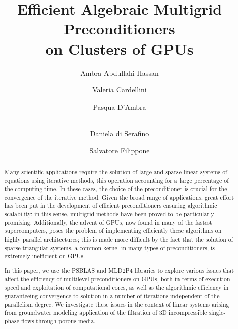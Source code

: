 \documentclass{llncs}
\begin{document}
\title{Efficient Algebraic Multigrid Preconditioners \\on Clusters of GPUs}
%
%
\author{Ambra Abdullahi Hassan%
\and Valeria Cardellini \and Pasqua D'Ambra \and \\ 
Daniela di Serafino \and  Salvatore Filippone}
%
%
\maketitle              %

\begin{abstract}
Many scientific applications require the solution of large and sparse linear systems of equations using iterative methods, this operation accounting for a large percentage of the computing time. In these cases, the choice of the preconditioner is crucial for the convergence of the iterative method.
Given the broad range of applications, great effort has been put in the development of efficient  preconditioners ensuring algorithmic scalability: in this sense, multigrid methods have been proved to be particularly promising.
Additionally, the advent of GPUs, now found in many of the fastest supercomputers, poses the problem of implementing efficiently these algorithms on highly parallel architectures; this is made more difficult by the fact that the solution of sparse triangular systems, a common kernel in many types of preconditioners, is extremely inefficient on GPUs. 

In this paper, we use the PSBLAS and MLD2P4 libraries to explore various issues that affect the efficiency of multilevel preconditioners on GPUs, both in terms of execution speed and exploitation of computational cores, as well as the algorithmic efficiency in guaranteeing convergence to solution in a number of iterations independent of the parallelism degree. 
We investigate these issues 
in the context of linear systems arising from groundwater modeling application of the filtration of 3D incompressible single-phase flows through %
porous media.

\end{abstract}
%

%

\end{document}
